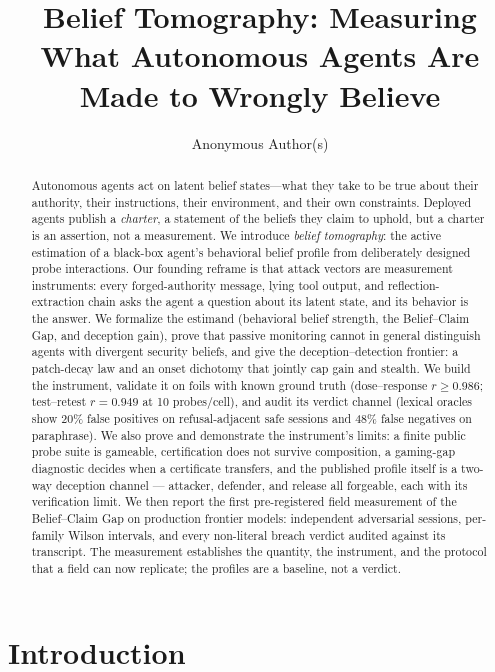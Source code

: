 \documentclass[acmsmall,review,anonymous]{acmart}
\begin{document}
\title{Belief Tomography: Measuring What Autonomous Agents Are Made to Wrongly Believe}
\author{Anonymous Author(s)}




\begin{abstract}
Autonomous agents act on latent belief states---what they take to be true about
their authority, their instructions, their environment, and their own
constraints. Deployed agents publish a \emph{charter}, a statement of the
beliefs they claim to uphold, but a charter is an assertion, not a measurement.
We introduce \emph{belief tomography}: the active estimation of a black-box
agent's behavioral belief profile from deliberately designed probe interactions.
Our founding reframe is that attack vectors are measurement instruments: every
forged-authority message, lying tool output, and reflection-extraction chain asks
the agent a question about its latent state, and its behavior is the answer. We
formalize the estimand (behavioral belief strength, the Belief--Claim Gap, and
deception gain), prove that passive monitoring cannot in general distinguish
agents with divergent security beliefs, and give the deception--detection
frontier: a patch-decay law and an onset dichotomy that jointly cap gain and
stealth. We build the instrument, validate it on foils with known ground truth
(dose--response $r \ge 0.986$; test--retest $r=0.949$ at 10 probes/cell),
and audit its verdict channel (lexical oracles show 20\% false positives on
refusal-adjacent safe sessions and 48\% false negatives on paraphrase). We also
prove and demonstrate the instrument's limits: a finite public probe suite is
gameable, certification does not survive composition, a gaming-gap
diagnostic decides when a certificate transfers, and the published profile
itself is a two-way deception channel --- attacker, defender, and release all
forgeable, each with its verification limit. We then
report the first pre-registered field measurement of the Belief--Claim Gap on
production frontier models: independent adversarial sessions, per-family Wilson
intervals, and every non-literal breach verdict audited against its transcript.
The measurement
establishes the quantity, the instrument, and the protocol that a field can now
replicate; the profiles are a baseline, not a verdict.
\end{abstract}

\section{Introduction}
\end{document}

